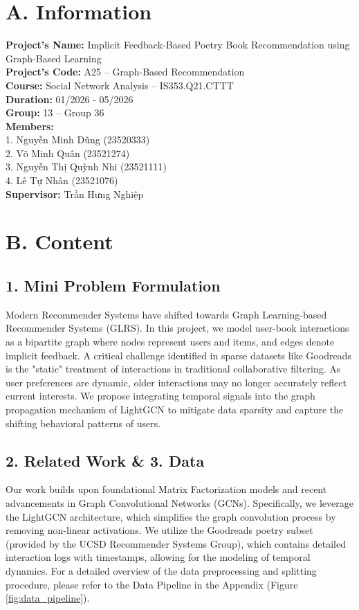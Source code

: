 \documentclass[conference]{IEEEtran}
\begin{document}
\section*{A. Information}
\noindent \textbf{Project's Name:} Implicit Feedback-Based Poetry Book Recommendation using Graph-Based Learning \\
\textbf{Project's Code:} A25 – Graph-Based Recommendation \\
\textbf{Course:} Social Network Analysis – IS353.Q21.CTTT \\
\textbf{Duration:} 01/2026 - 05/2026 \\
\textbf{Group:} 13 – Group 36 \\
\textbf{Members:}\\
1. Nguyễn Minh Dũng (23520333) \\
2. Võ Minh Quân (23521274) \\
3. Nguyễn Thị Quỳnh Nhi (23521111) \\
4. Lê Tự Nhân (23521076) \\
\textbf{Supervisor:} Trần Hưng Nghiệp

\vspace{1.5em}

\section*{B. Content}

\subsection*{1. Mini Problem Formulation}
Modern Recommender Systems have shifted towards Graph Learning-based Recommender Systems (GLRS). In this project, we model user-book interactions as a bipartite graph where nodes represent users and items, and edges denote implicit feedback. A critical challenge identified in sparse datasets like Goodreads is the "static" treatment of interactions in traditional collaborative filtering. As user preferences are dynamic, older interactions may no longer accurately reflect current interests. We propose integrating temporal signals into the graph propagation mechanism of LightGCN to mitigate data sparsity and capture the shifting behavioral patterns of users.

\subsection*{2. Related Work \& 3. Data}
Our work builds upon foundational Matrix Factorization models and recent advancements in Graph Convolutional Networks (GCNs). Specifically, we leverage the LightGCN architecture, which simplifies the graph convolution process by removing non-linear activations. We utilize the Goodreads poetry subset (provided by the UCSD Recommender Systems Group), which contains detailed interaction logs with timestamps, allowing for the modeling of temporal dynamics. For a detailed overview of the data preprocessing and splitting procedure, please refer to the Data Pipeline in the Appendix (Figure \ref{fig:data_pipeline}).
\end{document}
